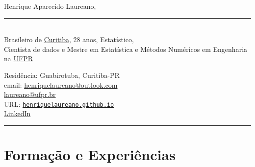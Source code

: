 \documentclass[12pt]{article}
\newcommand{\horrule}[1]{\noindent\rule{\linewidth}{#1}}
\begin{document}
\noindent
\begin{minipage}[t]{.565\textwidth}
 \raggedright
 \large Henrique Aparecido Laureano,
 \noindent\rule{.89\linewidth}{1pt}\\
 \normalsize Brasileiro de
 \href{https://goo.gl/K1Qcdv}{\color{blue}Curitiba}, 28 anos,
 Estat\'{i}stico,\\Cientista de dados e Mestre em Estatística e
 M\'{e}todos Num\'{e}ricos em Engenharia na
 \href{https://goo.gl/DtVAbi}{\color{blue}UFPR}
\end{minipage}%
\begin{minipage}[t]{.435\textwidth}
 \raggedright
 Resid\^{e}ncia: Guabirotuba, Curitiba-PR\\
 email:
 \href{mailto:henriquelaureano@outlook.com}{\color{blue}
   henriquelaureano@outlook.com}\\
 \hspace{1.2cm}
 \href{mailto:laureano@ufpr.br}{\color{blue}laureano@ufpr.br}\\
 URL:
 \href{https://henriquelaureano.github.io/}{
  \color{blue}\texttt{henriquelaureano.github.io}}\\
 \href{https://www.linkedin.com/in/henrique-laureano-025328179}{
  \color{blue}LinkedIn}
\end{minipage}

\vspace{0.5cm}
\horrule{1pt}

\vspace{-0.25cm}
\section*{Forma\c{c}\~{a}o e Experi\^{e}ncias}
\end{document}
